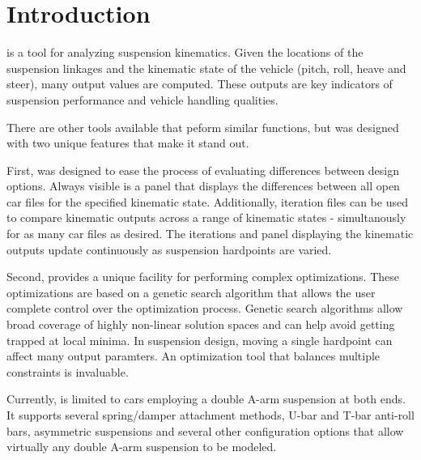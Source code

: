 \chapter{Introduction} \label{ch:introduction}


\vvase{} is a tool for analyzing suspension kinematics.  Given the locations of the suspension linkages and the kinematic state of the vehicle (pitch, roll, heave and steer), many output values are computed.  These outputs are key indicators of suspension performance and vehicle handling qualities.

There are other tools available that peform similar functions, but \vvase{} was designed with two unique features that make it stand out.

First, \vvase{} was designed to ease the process of evaluating differences between design options.  Always visible is a panel that displays the differences between all open car files for the specified kinematic state.  Additionally, iteration files can be used to compare kinematic outputs across a range of kinematic states - simultanously for as many car files as desired.  The iterations and panel displaying the kinematic outputs update continuously as suspension hardpoints are varied.

Second, \vvase{} provides a unique facility for performing complex optimizations.  These optimizations are based on a genetic search algorithm that allows the user complete control over the optimization process.  Genetic search algorithms allow broad coverage of highly non-linear solution spaces and can help avoid getting trapped at local minima.  In suspension design, moving a single hardpoint can affect many output paramters.  An optimization tool that balances multiple constraints is invaluable.

Currently, \vvase{} is limited to cars employing a double A-arm suspension at both ends.  It supports several spring/damper attachment methods, U-bar and T-bar anti-roll bars, asymmetric suspensions and several other configuration options that allow virtually any double A-arm suspension to be modeled.

